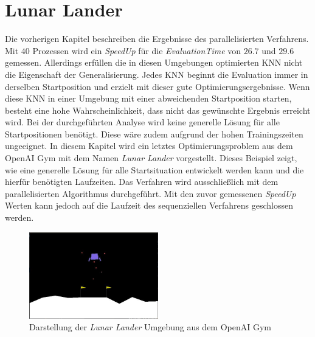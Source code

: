 \section{Lunar Lander}
Die vorherigen Kapitel beschreiben die Ergebnisse des parallelisierten Verfahrens. Mit $40$ Prozessen wird ein \emph{SpeedUp} für die \emph{EvaluationTime} von $26.7$ und $29.6$ gemessen. Allerdings erfüllen die in diesen Umgebungen optimierten \ac{KNN} nicht die Eigenschaft der Generalisierung. Jedes \ac{KNN} beginnt die Evaluation immer in derselben Startposition und erzielt mit dieser gute Optimierungsergebnisse. Wenn diese \ac{KNN} in einer Umgebung mit einer abweichenden Startposition starten, besteht eine hohe Wahrscheinlichkeit, dass nicht das gewünschte Ergebnis erreicht wird. Bei der durchgeführten Analyse wird keine generelle Lösung für alle Startpositionen benötigt. Diese wäre zudem aufgrund der hohen Trainingszeiten ungeeignet. In diesem Kapitel wird ein letztes Optimierungsproblem aus dem OpenAI Gym mit dem Namen \emph{Lunar Lander} vorgestellt. Dieses Beispiel zeigt, wie eine generelle Lösung für alle Startsituation entwickelt werden kann und die hierfür benötigten Laufzeiten. 
Das Verfahren wird ausschließlich mit dem parallelisierten Algorithmus durchgeführt. Mit den zuvor gemessenen \emph{SpeedUp} Werten kann jedoch auf die Laufzeit des sequenziellen Verfahrens geschlossen werden.
\begin{figure}[!h]
	\centering
	\includegraphics[width=0.5\textwidth]{./img/lunar_lander_env.JPG} 
	\caption{Darstellung der \emph{Lunar Lander} Umgebung aus dem OpenAI Gym}
	\label{fig:lunar_lander_env}
\end{figure} 
\\\\
